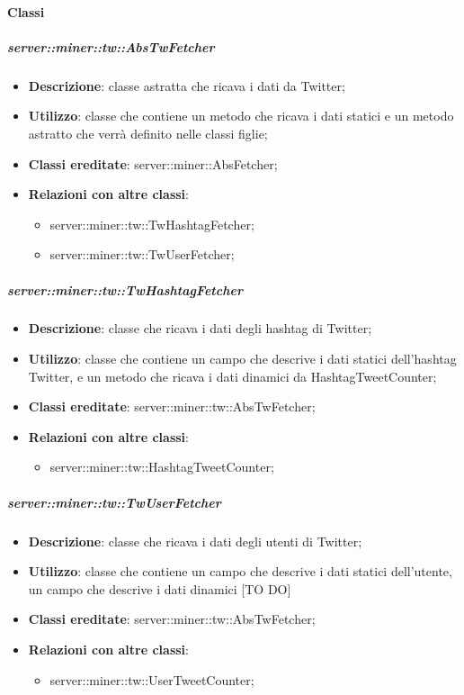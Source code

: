 	\paragraph{Classi} %
	\subparagraph{server::miner::tw::AbsTwFetcher} %
		\label{subp:server_miner_tw_AbsTwFetcher}
			\begin{itemize}
				\item \textbf{Descrizione}: classe astratta che ricava i dati da Twitter;
				\item \textbf{Utilizzo}: classe che contiene un metodo che ricava i dati statici e un metodo
astratto che verrà definito nelle classi figlie;
				\item \textbf{Classi ereditate}: server::miner::AbsFetcher;
				\item \textbf{Relazioni con altre classi}:
					\begin{itemize}
						\item server::miner::tw::TwHashtagFetcher;
						\item server::miner::tw::TwUserFetcher;
					\end{itemize}
			\end{itemize}

	\subparagraph{server::miner::tw::TwHashtagFetcher} %
		\label{subp:server_miner_tw_TwHashtagFetcher}
			\begin{itemize}
				\item \textbf{Descrizione}: classe che ricava i dati degli hashtag di Twitter;
				\item \textbf{Utilizzo}: classe che contiene un campo che descrive i dati statici dell'hashtag Twitter, e un metodo che ricava i dati dinamici da HashtagTweetCounter;
				\item \textbf{Classi ereditate}: server::miner::tw::AbsTwFetcher;
				\item \textbf{Relazioni con altre classi}:
					\begin{itemize}
						\item server::miner::tw::HashtagTweetCounter;
					\end{itemize}
			\end{itemize}

	\subparagraph{server::miner::tw::TwUserFetcher} %
		\label{subp:server_miner_tw_TwUserFetcher}
			\begin{itemize}
				\item \textbf{Descrizione}: classe che ricava i dati degli utenti di Twitter;
				\item \textbf{Utilizzo}: classe che contiene un campo che descrive i dati statici dell'utente, un campo che descrive i dati dinamici [TO DO]
				\item \textbf{Classi ereditate}: server::miner::tw::AbsTwFetcher;
				\item \textbf{Relazioni con altre classi}:
					\begin{itemize}
						\item server::miner::tw::UserTweetCounter;
					\end{itemize}
			\end{itemize}

